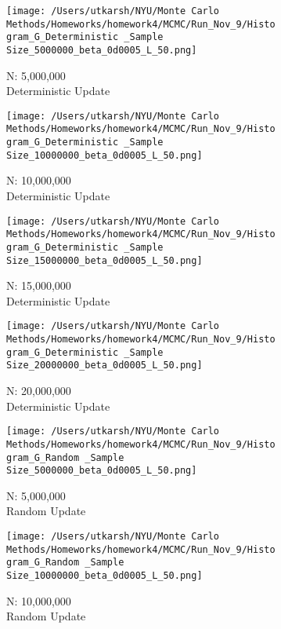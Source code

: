 \documentclass[11pt]{article}
\begin{document}
\begin{figure}[H]
	\centering
	\begin{subfigure}{.22\textwidth}
		\texttt{[image: /Users/utkarsh/NYU/Monte Carlo Methods/Homeworks/homework4/MCMC/Run\_Nov\_9/Histogram\_G\_Deterministic \_Sample Size\_5000000\_beta\_0d0005\_L\_50.png]}
		\caption{N: 5,000,000\\Deterministic Update}
	\end{subfigure}
    \begin{subfigure}{.22\textwidth}
		\texttt{[image: /Users/utkarsh/NYU/Monte Carlo Methods/Homeworks/homework4/MCMC/Run\_Nov\_9/Histogram\_G\_Deterministic \_Sample Size\_10000000\_beta\_0d0005\_L\_50.png]}
		\caption{N: 10,000,000\\Deterministic Update}
	\end{subfigure}
    \begin{subfigure}{.22\textwidth}
		\texttt{[image: /Users/utkarsh/NYU/Monte Carlo Methods/Homeworks/homework4/MCMC/Run\_Nov\_9/Histogram\_G\_Deterministic \_Sample Size\_15000000\_beta\_0d0005\_L\_50.png]}
		\caption{N: 15,000,000\\Deterministic Update}
	\end{subfigure}
    \begin{subfigure}{.22\textwidth}
		\texttt{[image: /Users/utkarsh/NYU/Monte Carlo Methods/Homeworks/homework4/MCMC/Run\_Nov\_9/Histogram\_G\_Deterministic \_Sample Size\_20000000\_beta\_0d0005\_L\_50.png]}
		\caption{N: 20,000,000\\Deterministic Update}
	\end{subfigure}        
	\begin{subfigure}{.22\textwidth}
		\texttt{[image: /Users/utkarsh/NYU/Monte Carlo Methods/Homeworks/homework4/MCMC/Run\_Nov\_9/Histogram\_G\_Random \_Sample Size\_5000000\_beta\_0d0005\_L\_50.png]}
		\caption{N: 5,000,000\\Random Update}
	\end{subfigure}
    \begin{subfigure}{.22\textwidth}
		\texttt{[image: /Users/utkarsh/NYU/Monte Carlo Methods/Homeworks/homework4/MCMC/Run\_Nov\_9/Histogram\_G\_Random \_Sample Size\_10000000\_beta\_0d0005\_L\_50.png]}
		\caption{N: 10,000,000\\Random Update}
	\end{subfigure}
    \begin{subfigure}{.22\textwidth}

\end{subfigure}
\end{figure}
\end{document}
